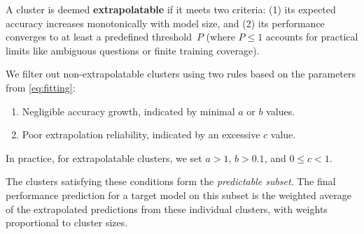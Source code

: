 A cluster is deemed \textbf{extrapolatable} if it meets two criteria: (1) its expected accuracy increases monotonically with model size, and (2) its performance converges to at least a predefined threshold~$P$ (where $P \leq 1$ accounts for practical limits like ambiguous questions or finite training coverage). 

We filter out non-extrapolatable clusters using two rules based on the parameters from \cref{eq:fitting}:
\begin{enumerate}[leftmargin=1.5em]
    \item Negligible accuracy growth, indicated by minimal $a$ or $b$ values.
    \item Poor extrapolation reliability, indicated by an excessive $c$ value.
\end{enumerate}
In practice, for extrapolatable clusters, we set $a > 1$, $b > 0.1$, and $0 \leq c < 1$. 

The clusters satisfying these conditions form the \textit{predictable subset}. The final performance prediction for a target model on this subset is the weighted average of the extrapolated predictions from these individual clusters, with weights proportional to cluster sizes.

